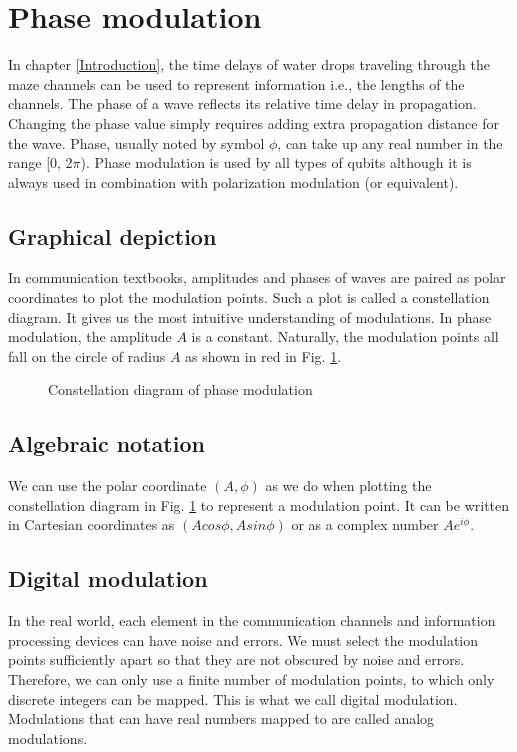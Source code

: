 \documentclass[oneside, letter, 12pt]{book}
\begin{document}
\section{Phase modulation}
In chapter \ref{Introduction}, the time delays of water drops traveling through the maze channels can be used to represent information i.e., the lengths of the channels. The phase of a wave reflects its relative time delay in propagation. Changing the phase value simply requires adding extra propagation distance for the wave. Phase, usually noted by symbol $\phi$, can take up any real number in the range [0, 2$\pi$). Phase modulation is used by all types of qubits although it is always used in combination with polarization modulation (or equivalent).

\subsection{Graphical depiction}
In communication textbooks, amplitudes and phases of waves are paired as polar coordinates to plot the modulation points. Such a plot is called a constellation diagram. It gives us the most intuitive understanding of modulations. In phase modulation, the amplitude $A$ is a constant. Naturally, the modulation points all fall on the circle of radius $A$ as shown in red in Fig. \ref{PM}.

\begin{figure}[ht]\label{PM}
\caption{Constellation diagram of phase modulation}
\end{figure}

\subsection{Algebraic notation}
We can use the polar coordinate $(A, \phi)$ as we do when plotting the constellation diagram in Fig. \ref{PM} to represent a modulation point. It can be written in Cartesian coordinates as $(A cos\phi, A sin\phi)$ or as a complex number $A e^{i\phi}$.

\subsection{Digital modulation}
In the real world, each element in the communication channels and information processing devices can have noise and errors. We must select the modulation points sufficiently apart so that they are not obscured by noise and errors. Therefore, we can only use a finite number of modulation points, to which only discrete integers can be mapped. This is what we call digital modulation. Modulations that can have real numbers mapped to are called analog modulations.
\end{document}
